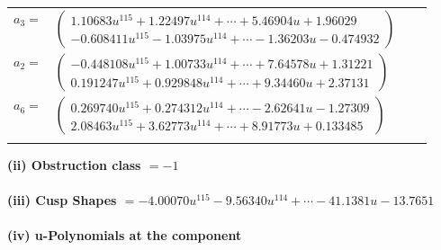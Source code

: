 \documentclass[1p]{elsarticle_modified}
\theoremstyle{definition}
\begin{document}
\begin{tabular}{m{7pt} m{180pt} m{7pt} m{180pt} }
\flushright $a_{3}=$&$\begin{pmatrix}1.10683 u^{115}+1.22497 u^{114}+\cdots+5.46904 u+1.96029\\-0.608411 u^{115}-1.03975 u^{114}+\cdots-1.36203 u-0.474932\end{pmatrix}$ \\
\flushright $a_{2}=$&$\begin{pmatrix}-0.448108 u^{115}+1.00733 u^{114}+\cdots+7.64578 u+1.31221\\0.191247 u^{115}+0.929848 u^{114}+\cdots+9.34460 u+2.37131\end{pmatrix}$ \\
\flushright $a_{6}=$&$\begin{pmatrix}0.269740 u^{115}+0.274312 u^{114}+\cdots-2.62641 u-1.27309\\2.08463 u^{115}+3.62773 u^{114}+\cdots+8.91773 u+0.133485\end{pmatrix}$\\&\end{tabular}
\flushleft \textbf{(ii) Obstruction class $= -1$}\\~\\
\flushleft \textbf{(iii) Cusp Shapes $= -4.00070 u^{115}-9.56340 u^{114}+\cdots-41.1381 u-13.7651$}\\~\\
\newpage\renewcommand{\arraystretch}{1}
\flushleft \textbf{(iv) u-Polynomials at the component}\newline \\
\end{document}
